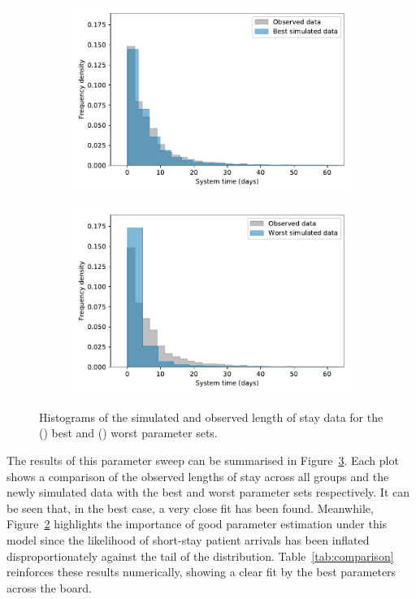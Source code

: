 \documentclass[11pt]{article}
\newlength{\imgwidth}
\begin{document}
\begin{figure}
    \centering%
    \begin{subfigure}{.5\imgwidth}
        \includegraphics[width=\linewidth]{img_best_params}
        \caption{}\label{fig:best_params}
    \end{subfigure}\hfill%
    \begin{subfigure}{.5\imgwidth}
        \includegraphics[width=\linewidth]{img_worst_params}
        \caption{}\label{fig:worst_params}
    \end{subfigure}
    \caption{Histograms of the simulated and observed length of stay data for
             the () best and ()
             worst parameter sets.}\label{fig:params}
\end{figure}

The results of this parameter sweep can be summarised in
Figure~\ref{fig:params}. Each plot shows a comparison of the observed lengths
of stay across all groups and the newly simulated data with the best and worst
parameter sets respectively. It can be seen that, in the best case, a very close
fit has been found. Meanwhile, Figure~\ref{fig:worst_params} highlights the
importance of good parameter estimation under this model since the likelihood of
short-stay patient arrivals has been inflated disproportionately against the
tail of the distribution. Table~\ref{tab:comparison} reinforces these results
numerically, showing a clear fit by the best parameters across the board.
\end{document}
